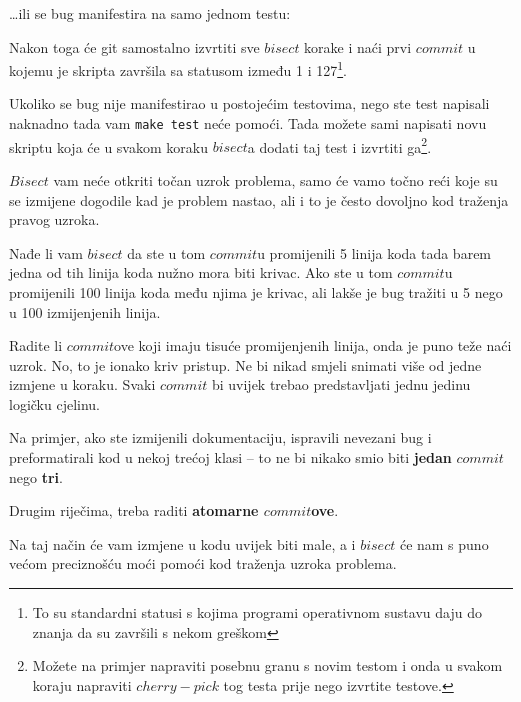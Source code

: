 \dots{}ili se bug manifestira na samo jednom testu:


Nakon toga će git samostalno izvrtiti sve $bisect$ korake i naći prvi $commit$ u kojemu je skripta završila sa statusom između 1 i 127\footnote{To su standardni statusi s kojima programi operativnom sustavu daju do znanja da su završili s nekom greškom}.

Ukoliko se bug nije manifestirao u postojećim testovima, nego ste test napisali naknadno tada vam \verb+make test+ neće pomoći.
Tada možete sami napisati novu skriptu koja će u svakom koraku $bisect$a dodati taj test i izvrtiti ga\footnote{Možete na primjer napraviti posebnu granu s novim testom i onda u svakom koraju napraviti $cherry-pick$ tog testa prije nego izvrtite testove.}.


$Bisect$ vam neće otkriti točan uzrok problema, samo će vamo točno reći koje su se izmijene dogodile kad je problem nastao, ali i to je često dovoljno kod traženja pravog uzroka. 

Nađe li vam $bisect$ da ste u tom $commit$u promijenili 5 linija koda tada barem jedna od tih linija koda nužno mora biti krivac.
Ako ste u tom $commit$u promijenili 100 linija koda među njima je krivac, ali lakše je bug tražiti u 5 nego u 100 izmijenjenih linija.

Radite li $commit$ove koji imaju tisuće promijenjenih linija, onda je puno teže naći uzrok.
No, to je ionako kriv pristup.
Ne bi nikad smjeli snimati više od jedne izmjene u koraku.
Svaki $commit$ bi uvijek trebao predstavljati jednu jedinu logičku cjelinu.

Na primjer, ako ste izmijenili dokumentaciju, ispravili nevezani bug i preformatirali kod u nekoj trećoj klasi -- to ne bi nikako smio biti \textbf{jedan} $commit$ nego \textbf{tri}.

Drugim riječima, treba raditi \textbf{atomarne $commit$ove}.

Na taj način će vam izmjene u kodu uvijek biti male, a i $bisect$ će nam s puno većom preciznošću moći pomoći kod traženja uzroka problema.
